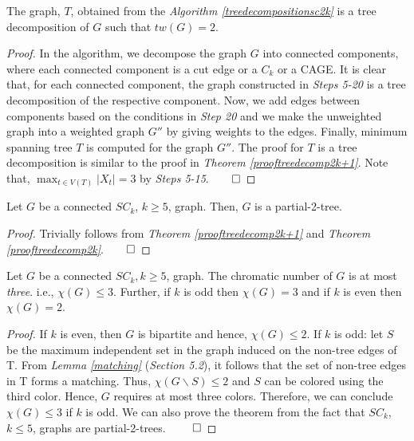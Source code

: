 \documentclass[runningheads]{llncs}
\begin{document}
\newpage

\begin{theorem}
The graph, $T$, obtained from the \emph{Algorithm \ref{treedecompositionsc2k}} is a tree decomposition of $G$ such that $tw(G) = 2$.
\label{prooftreedecomp2k}
\end{theorem}
\begin{proof}
In the algorithm, we decompose the graph $G$ into connected components, where each connected component is a cut edge or a $C_k$ or a CAGE. It is clear that, for each connected component, the graph constructed in \emph{Steps 5-20} is a tree decomposition of the respective component. Now, we add edges between components based on the conditions in \emph{Step 20} and we make the unweighted graph into a weighted graph $G''$ by giving weights to the edges. Finally, minimum spanning tree $T$ is computed for the graph $G''$. The proof for $T$ is a tree decomposition is similar to the proof in \emph{Theorem \ref{prooftreedecomp2k+1}}. Note that, $\max_{t \in V(T)} \vert X_t \vert = 3$ by \emph{Steps 5-15}.$\hfill \qed$
\end{proof}

\begin{corollary}
\label{partial}
Let $G$ be a connected $SC_k$, $k\geq 5$, graph. Then, $G$ is a partial-2-tree.
\end{corollary}
\begin{proof}
Trivially follows from \emph{Theorem \ref{prooftreedecomp2k+1}} and \emph{Theorem \ref{prooftreedecomp2k}}.$\hfill \qed$
\end{proof}


\begin{theorem}
\label{coloring}
Let $G$ be a connected $SC_k, k \geq 5$, graph. The chromatic number of $G$ is at most \emph{three}. i.e., $\chi(G) \leq 3$. Further, if $k$ is odd then $\chi(G) = 3$ and  if $k$ is even then $\chi(G) = 2$.
\end{theorem}
\begin{proof}
If $k$ is even, then $G$ is bipartite and hence, $\chi(G) \leq 2$. If $k$ is odd: 
let $S$ be the maximum independent set in the graph induced on the non-tree edges of T. From \emph{Lemma \ref{matching}} (\emph{Section 5.2}), it follows that the set of non-tree edges in T forms a matching. Thus, $\chi (G\backslash S) \leq 2$ and $S$ can be colored using the third color. Hence, $G$ requires at most three colors. Therefore, we can conclude $\chi(G) \leq 3$ if $k$ is odd. We can also prove the theorem from the fact that $SC_k$, $k\leq 5$, graphs are partial-2-trees.  $\hfill \qed$
\end{proof}
\end{document}
